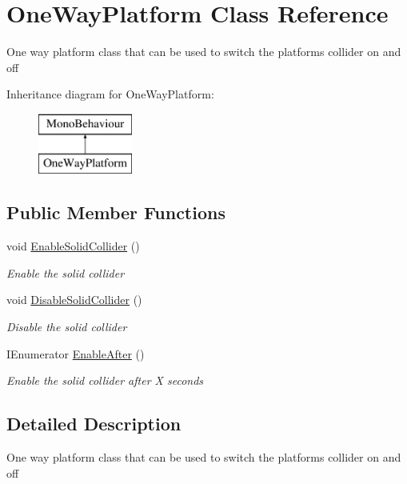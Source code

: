 \hypertarget{class_one_way_platform}{}\section{One\+Way\+Platform Class Reference}
\label{class_one_way_platform}


One way platform class that can be used to switch the platforms collider on and off  


Inheritance diagram for One\+Way\+Platform\+:\begin{figure}[H]
\begin{center}
\leavevmode
\includegraphics[height=2.000000cm]{class_one_way_platform}
\end{center}
\end{figure}
\subsection*{Public Member Functions}
\begin{DoxyCompactItemize}
\item 
void \mbox{\hyperlink{class_one_way_platform_a10b0da79a1b619409a8186f9766bb810}{Enable\+Solid\+Collider}} ()
\begin{DoxyCompactList}\small\item\em Enable the solid collider \end{DoxyCompactList}\item 
void \mbox{\hyperlink{class_one_way_platform_a1b8029968caa73f149a312d1113d1176}{Disable\+Solid\+Collider}} ()
\begin{DoxyCompactList}\small\item\em Disable the solid collider \end{DoxyCompactList}\item 
I\+Enumerator \mbox{\hyperlink{class_one_way_platform_aa1651ae509037fd1bb7e0bf567f36c60}{Enable\+After}} ()
\begin{DoxyCompactList}\small\item\em Enable the solid collider after X seconds \end{DoxyCompactList}\end{DoxyCompactItemize}


\subsection{Detailed Description}
One way platform class that can be used to switch the platforms collider on and off 




